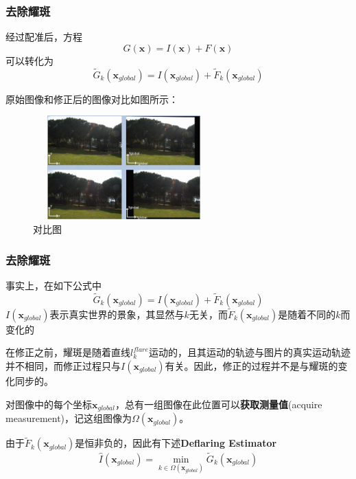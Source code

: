 \documentclass{beamer}
\begin{document}
\begin{frame}
\frametitle{去除耀斑}
经过配准后，方程  
\begin{equation}
G(\textbf{x})=I(\textbf{x})+F(\textbf{x})
\end{equation}                                  
可以转化为
\begin{equation}
\widetilde{G}_k(\textbf{x}_{global})=I(\textbf{x}_{global})+\widetilde{F}_k(\textbf{x}_{global})
\end{equation}   

原始图像和修正后的图像对比如图所示：
\begin{figure}[!h]
\centering
\includegraphics[height=4cm,width=7cm]{2022120501.png}
\caption{对比图}
\end{figure}
\end{frame}
\begin{frame}
\frametitle{去除耀斑}
事实上，在如下公式中
\begin{equation}
\widetilde{G}_k(\textbf{x}_{global})=I(\textbf{x}_{global})+\widetilde{F}_k(\textbf{x}_{global})
\end{equation}   
$I(\textbf{x}_{global})$表示真实世界的景象，其显然与$k$无关，而$\widetilde{F}_k(\textbf{x}_{global})$是随着不同的$k$而变化的\pause

在修正之前，耀斑是随着直线$l_k^{flare}$运动的，且其运动的轨迹与图片的真实运动轨迹并不相同，而修正过程只与$I(\textbf{x}_{global})$有关。因此，修正的过程并不是与耀斑的变化同步的。\pause

对图像中的每个坐标$\textbf{x}_{global}$，总有一组图像在此位置可以\textbf{获取测量值}(acquire measurement)，记这组图像为$\Omega(\textbf{x}_{global})$。\pause

由于$\widetilde{F}_k(\textbf{x}_{global})$是恒非负的，因此有下述\textbf{Deflaring Estimator}
\begin{equation}
\hat{I}(\textbf{x}_{global})=\min_{k\in \Omega(\textbf{x}_{global})}\widetilde{G}_k(\textbf{x}_{global})
\end{equation}
\end{frame}
\end{document}
